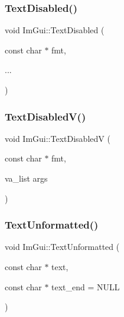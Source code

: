 \mbox{\label{namespace_im_gui_aa96bf14c5fa288e106820aeb4ba7fcb6}} 
\subsubsection{\texorpdfstring{Text\+Disabled()}{TextDisabled()}}
{\footnotesize\ttfamily void Im\+Gui\+::\+Text\+Disabled (\begin{DoxyParamCaption}\item[{const char $\ast$}]{fmt,  }\item[{}]{... }\end{DoxyParamCaption})}

\mbox{\label{namespace_im_gui_a5b128d4f12d7e33e95fb9cef7dce027e}} 
\subsubsection{\texorpdfstring{Text\+Disabled\+V()}{TextDisabledV()}}
{\footnotesize\ttfamily void Im\+Gui\+::\+Text\+DisabledV (\begin{DoxyParamCaption}\item[{const char $\ast$}]{fmt,  }\item[{va\+\_\+list}]{args }\end{DoxyParamCaption})}

\mbox{\label{namespace_im_gui_a96a5f42789ecc419b2ae8af7b2acc28e}} 
\subsubsection{\texorpdfstring{Text\+Unformatted()}{TextUnformatted()}}
{\footnotesize\ttfamily void Im\+Gui\+::\+Text\+Unformatted (\begin{DoxyParamCaption}\item[{const char $\ast$}]{text,  }\item[{const char $\ast$}]{text\+\_\+end = {\ttfamily NULL} }\end{DoxyParamCaption})}

\mbox{\label{namespace_im_gui_a10a0d6362178c2f743092f21e1b6cd20}} 
